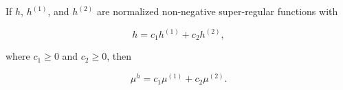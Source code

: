 If $h$, $h^{(1)}$, and $h^{(2)}$ are normalized non-negative super-regular functions with

$$h = c_1h^{(1)} + c_2h^{(2)},$$

where $c_1 \geq 0$ and $c_2 \geq 0$, then

$$\mu^h = c_1\mu^{(1)} + c_2\mu^{(2)}.$$
